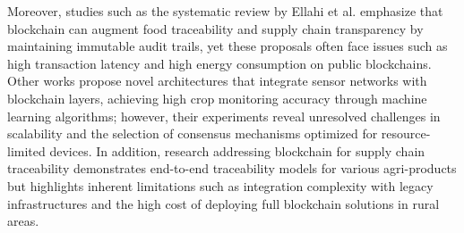 \documentclass[12pt,onecolumn]{IEEEtran} %
\begin{document}
Moreover, studies such as the systematic review by Ellahi et al. \cite{ellahi2023blockchainbasedframeworksfor} emphasize that blockchain can augment food traceability and supply chain transparency by maintaining immutable audit trails, yet these proposals often face issues such as high transaction latency and high energy consumption on public blockchains. Other works \cite{sakthivel2024enhancingtransparencyand, sizan2505asecuredtriad} propose novel architectures that integrate sensor networks with blockchain layers, achieving high crop monitoring accuracy through machine learning algorithms; however, their experiments reveal unresolved challenges in scalability and the selection of consensus mechanisms optimized for resource-limited devices. In addition, research addressing blockchain for supply chain traceability \cite{vitaskos2024blockchainandinternet, tang2024assessingblockchainand} demonstrates end-to-end traceability models for various agri-products but highlights inherent limitations such as integration complexity with legacy infrastructures and the high cost of deploying full blockchain solutions in rural areas.
\end{document}
